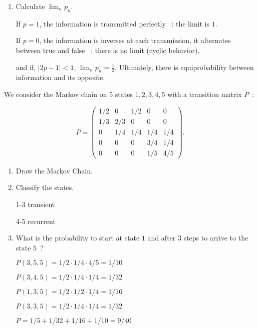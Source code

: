 \documentclass[a4paper,11pt]{exam}
\begin{document}
\begin{questions}
\begin{enumerate}
	\item Calculate $\lim_n p_n$.
	
	
	\begin{solution}
		If $p=1$, the information is transmitted perfectly ~: the limit is $1$.
		
		If $p=0$, the information is inverses at each transmission, it alternates between true and false ~: there is no limit (cyclic behavior).
		
		and if, $|2p-1|<1$, $\lim_n p_n = \frac{1}{2}$.
		Ultimately, there is equiprobability between information and its opposite.
	\end{solution}
\end{enumerate}



\question
We consider the Markov chain on $ 5 $ states $ 1,2,3,4,5$ with a transition matrix $P$~:

$$P=\left( \begin{array}{ccccc}1/2&0&1/2&0&0\\1/3&2/3&0&0&0\\0&1/4&1/4&1/4&1/4\\0&0&0&3/4&1/4\\0&0&0&1/5&4/5 \end{array} \right). $$

\begin{enumerate}
	\item Draw the Markov Chain.
	\begin{solution}

	\end{solution}
	\item Classify the states.
	\begin{solution}
		1-3 transient
		
		4-5 recurrent
	\end{solution}
	\item What is the probability to start at state $ 1 $ and after $ 3 $ steps to arrive to the state $ 5 $~?
	\begin{solution}
		$P(3,5,5) = 1/2\cdot1/4\cdot4/5=1/10$
		
		$P(3,4,5) = 1/2\cdot1/4\cdot1/4=1/32$
		
		$P(1,3,5) = 1/2\cdot1/2\cdot1/4=1/16$ 
		
		$P(3,3,5) = 1/2\cdot1/4\cdot1/4=1/32$
		
		$P = 1/5+1/32 + 1/16 +1/10 = 9/40$
	\end{solution}
\end{enumerate}


\end{questions}
\end{document}
